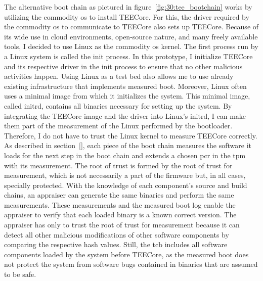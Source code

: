 The alternative boot chain as pictured in figure~\ref{fig:30:tee_bootchain}
works by utilizing the commodity \gls{os} to install TEECore. For this, the
driver required by the commodity \gls{os} to communicate to TEECore also sets up
TEECore. Because of its wide use in cloud environments, open-source nature, and
many freely available tools, I decided to use Linux as the commodity \gls{os}
kernel. The first process run by a Linux system is called the init process. In
this prototype, I initialize TEECore and its respective driver in the init
process to ensure that no other malicious activities happen. Using Linux as a
test bed also allows me to use already existing infrastructure that implements
measured boot. Moreover, Linux often uses a minimal image from which it
initializes the system. This minimal image, called initrd, contains all binaries
necessary for setting up the system. By integrating the TEECore image and the
driver into Linux's initrd, I can make them part of the measurement of the Linux
performed by the bootloader. Therefore, I do not have to trust the Linux kernel
to measure TEECore correctly. \\

As described in section~\ref{}, each
piece of the boot chain measures the software it loads for the next step in the
boot chain and extends a chosen \gls{pcr} in the \gls{tpm} with its measurement.
The root of trust is formed by the root of trust for measurement, which is not
necessarily a part of the firmware but, in all cases, specially protected. With
the knowledge of each component's source and build chains, an appraiser can
generate the same binaries and perform the same measurements. These measurements
and the measured boot log enable the appraiser to verify that each loaded binary
is a known correct version. The appraiser has only to trust the root of trust
for measurement because it can detect all other malicious modifications of other
software components by comparing the respective hash values. Still, the
\gls{tcb} includes all software components loaded by the system before TEECore,
as the measured boot does not protect the system from software bugs contained in
binaries that are assumed to be safe.

